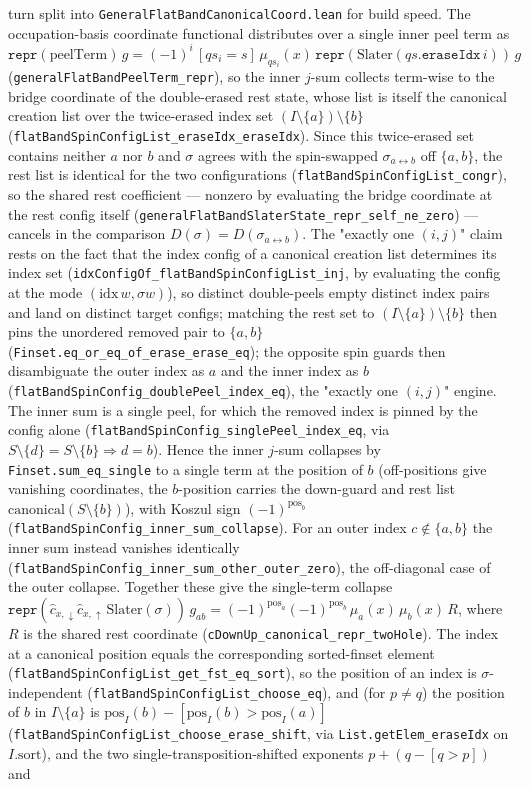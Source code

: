\documentclass[a4paper,11pt]{article}
\begin{document}
turn split into \texttt{GeneralFlatBandCanonicalCoord.lean} for build speed.  The occupation-basis coordinate functional distributes over a single inner peel term as $\texttt{repr}(\text{peelTerm})\,g = (-1)^i\,[qs_i{=}s]\,\mu_{qs_i}(x)\,\texttt{repr}(\text{Slater}(qs.\texttt{eraseIdx}\,i))\,g$ (\texttt{generalFlatBandPeelTerm\_repr}), so the inner $j$-sum collects term-wise to the bridge coordinate of the double-erased rest state, whose list is itself the canonical creation list over the twice-erased index set $(I\setminus\{a\})\setminus\{b\}$ (\texttt{flatBandSpinConfigList\_eraseIdx\_eraseIdx}).  Since this twice-erased set contains neither $a$ nor $b$ and $\sigma$ agrees with the spin-swapped $\sigma_{a\leftrightarrow b}$ off $\{a,b\}$, the rest list is identical for the two configurations (\texttt{flatBandSpinConfigList\_congr}), so the shared rest coefficient --- nonzero by evaluating the bridge coordinate at the rest config itself (\texttt{generalFlatBandSlaterState\_repr\_self\_ne\_zero}) --- cancels in the comparison $D(\sigma)=D(\sigma_{a\leftrightarrow b})$.  The "exactly one $(i,j)$" claim rests on the fact that the index config of a canonical creation list determines its index set (\texttt{idxConfigOf\_flatBandSpinConfigList\_inj}, by evaluating the config at the mode $(\mathrm{idx}\,w,\sigma w)$), so distinct double-peels empty distinct index pairs and land on distinct target configs; matching the rest set to $(I\setminus\{a\})\setminus\{b\}$ then pins the unordered removed pair to $\{a,b\}$ (\texttt{Finset.eq\_or\_eq\_of\_erase\_erase\_eq}); the opposite spin guards then disambiguate the outer index as $a$ and the inner index as $b$ (\texttt{flatBandSpinConfig\_doublePeel\_index\_eq}), the "exactly one $(i,j)$" engine.  The inner sum is a single peel, for which the removed index is pinned by the config alone (\texttt{flatBandSpinConfig\_singlePeel\_index\_eq}, via $S\setminus\{d\}=S\setminus\{b\}\Rightarrow d=b$).  Hence the inner $j$-sum collapses by \texttt{Finset.sum\_eq\_single} to a single term at the position of $b$ (off-positions give vanishing coordinates, the $b$-position carries the down-guard and rest list $\mathrm{canonical}(S\setminus\{b\})$), with Koszul sign $(-1)^{\mathrm{pos}_b}$ (\texttt{flatBandSpinConfig\_inner\_sum\_collapse}).  For an outer index $c\notin\{a,b\}$ the inner sum instead vanishes identically (\texttt{flatBandSpinConfig\_inner\_sum\_other\_outer\_zero}), the off-diagonal case of the outer collapse.  Together these give the single-term collapse $\texttt{repr}(\hat c_{x,\downarrow}\hat c_{x,\uparrow}\,\mathrm{Slater}(\sigma))\,g_{ab} = (-1)^{\mathrm{pos}_a}(-1)^{\mathrm{pos}_b}\,\mu_a(x)\,\mu_b(x)\,R$, where $R$ is the shared rest coordinate (\texttt{cDownUp\_canonical\_repr\_twoHole}).  The index at a canonical position equals the corresponding sorted-finset element (\texttt{flatBandSpinConfigList\_get\_fst\_eq\_sort}), so the position of an index is $\sigma$-independent (\texttt{flatBandSpinConfigList\_choose\_eq}), and (for $p\neq q$) the position of $b$ in $I\setminus\{a\}$ is $\mathrm{pos}_I(b)-[\mathrm{pos}_I(b)>\mathrm{pos}_I(a)]$ (\texttt{flatBandSpinConfigList\_choose\_erase\_shift}, via \texttt{List.getElem\_eraseIdx} on $I.\mathrm{sort}$), and the two single-transposition-shifted exponents $p+(q-[q>p])$ and 
\end{document}
